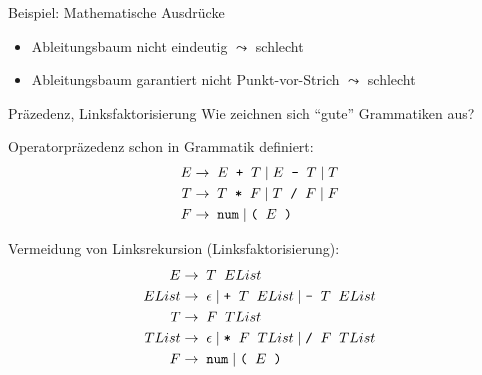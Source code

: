 \documentclass{beamer}
\begin{document}
\begin{frame}{Beispiel: Mathematische Ausdrücke}
	\pause

	\begin{itemize}
		\item Ableitungsbaum nicht eindeutig $\leadsto$ schlecht
		\item Ableitungsbaum garantiert nicht Punkt-vor-Strich $\leadsto$ schlecht
	\end{itemize}
\end{frame}

\begin{frame}{Präzedenz, Linksfaktorisierung}
	Wie zeichnen sich \enquote{gute} Grammatiken aus?
	\pause

	Operatorpräzedenz schon in Grammatik definiert:
	\begin{align*}
		E \to & \;\; E \;\; \textrm{\texttt{+}} \;\; T \mid E \;\; \textrm{\texttt{-}} \;\; T \mid T\\
		T \to & \;\; T \;\; \textrm{\texttt{*}} \;\; F \mid T \;\; \textrm{\texttt{/}} \;\; F \mid F\\
		F \to & \;\; \textrm{\texttt{num}} \; | \; \textrm{\texttt{(}} \;\; E \;\; \textrm{\texttt{)}}
	\end{align*}

	\pause

	Vermeidung von Linksrekursion (Linksfaktorisierung):
	\begin{align*}
		E     \to & \;\; T \;\; EList\\
		EList \to & \;\; \epsilon \mid \textrm{\texttt{+}} \;\; T \;\; EList \mid \textrm{\texttt{-}} \;\; T \;\; EList\\
		T     \to & \;\; F \;\; TList\\
		TList \to & \;\; \epsilon \mid \textrm{\texttt{*}} \;\; F \;\; TList \mid \textrm{\texttt{/}} \;\; F \;\; TList\\
		F \to & \;\; \textrm{\texttt{num}} \; | \; \textrm{\texttt{(}} \;\; E \;\; \textrm{\texttt{)}}
	\end{align*}
\end{frame}
\end{document}
